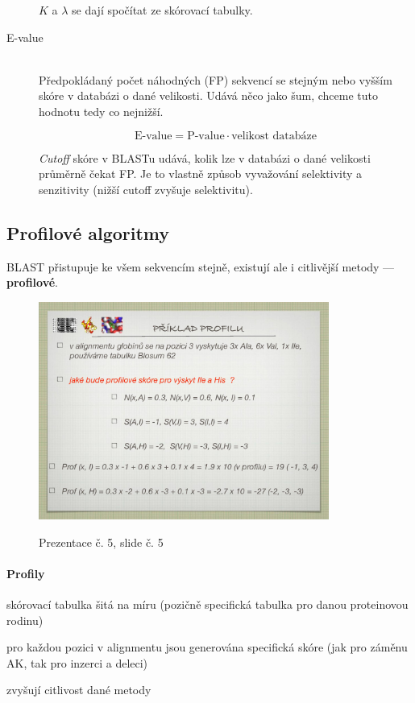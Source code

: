\documentclass[DIV=8]{scrreprt}
\begin{document}
\begin{description}
\(K\) a \(\lambda\) se dají spočítat ze skórovací tabulky.


\item[E-value]\hfill \\
Předpokládaný počet náhodných (FP) sekvencí se stejným nebo vyšším skóre v databázi o dané velikosti. Udává něco jako šum, chceme tuto hodnotu tedy co nejnižší.

\[\text{E-value} = \text{P-value} \cdot \text{velikost databáze}\]

\emph{Cutoff} skóre v BLASTu udává, kolik lze v databázi o dané velikosti průměrně čekat FP. Je to vlastně způsob vyvažování selektivity a senzitivity (nižší cutoff zvyšuje selektivitu).

\end{description}


\subsection{Profilové algoritmy} \label{Profilové algoritmy}


BLAST přistupuje ke všem sekvencím stejně, existují ale i citlivější metody --- \textbf{profilové}.

\begin{figure}
    \caption{Prezentace č. 5, slide č. 5}
    \includegraphics[width=0.85\textwidth]{slides-5/slide-5.jpg}
    \centering
    \label{slides-5-slide-5}
\end{figure}

\paragraph{Profily}
\begin{myItemize}[nosep]
    \item skórovací tabulka šitá na míru (pozičně specifická tabulka pro danou proteinovou rodinu)
    \item pro každou pozici v alignmentu jsou generována specifická skóre (jak pro záměnu AK, tak pro inzerci a deleci)
    \item zvyšují citlivost dané metody
\end{myItemize}
\end{document}
